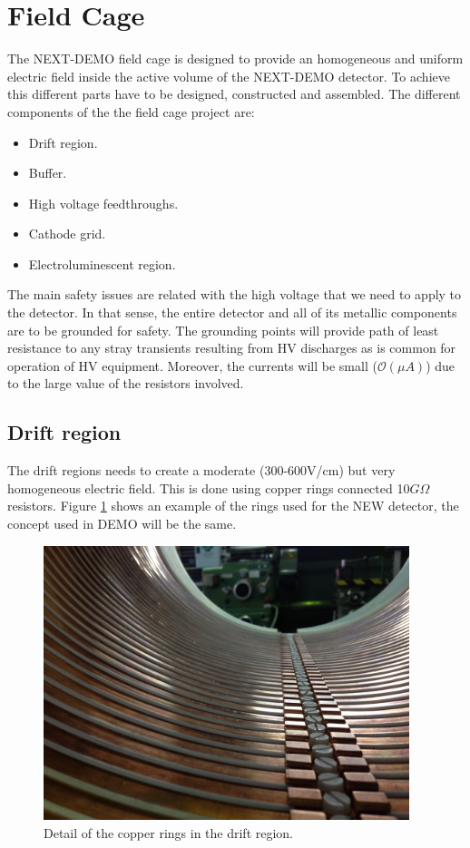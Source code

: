 \section{Field Cage} \label{sec:Introduction} 


The NEXT-DEMO field cage is designed to provide an homogeneous and uniform electric field inside the active volume of the NEXT-DEMO detector. To achieve this different parts have to be designed, constructed and assembled. The different components of the the field cage project are:
\begin{itemize}
\item Drift region.
\item Buffer.
\item High voltage feedthroughs.
\item Cathode grid.
\item Electroluminescent region.
\end{itemize}


The main safety issues are related with the high voltage that we need to apply to the detector. In that sense, the entire detector and all of its metallic components are to be grounded for safety. The grounding points will provide path of least resistance to any stray transients resulting from HV discharges as is common for operation of HV equipment. Moreover, the currents will be small ($\mathcal{O}(\mu A)$) due to the large value of the resistors involved.

\subsection{Drift region}

The drift regions needs to create a moderate (300-600V/cm) but very homogeneous electric field. This is done using copper rings connected 10$G\Omega$ resistors. Figure \ref{fig:drift1} shows an example of the rings used for the NEW detector, the concept used in DEMO will be the same.

\begin{figure}[h!]
\centering
\includegraphics[height=8cm]{img/IMG_0246.JPG}
\caption{Detail of the copper rings in the drift region.} \label{fig:drift1}
\end{figure}


